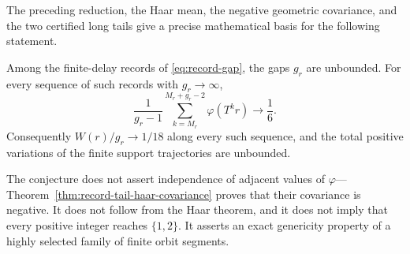 The preceding reduction, the Haar mean, the negative geometric covariance,
and the two certified long tails give a precise mathematical basis for the
following statement.

\begin{conjecture}
\label{conj:record-tail-genericity}
Among the finite-delay records of \eqref{eq:record-gap}, the gaps $g_r$ are
unbounded.  For every sequence of such records with $g_r\to\infty$,
\begin{equation}
 \frac1{g_r-1}\sum_{k=M_r}^{M_r+g_r-2}
       \varphi(T^kr)\longrightarrow\frac16.
 \label{eq:record-tail-genericity}
\end{equation}
Consequently $W(r)/g_r\to1/18$ along every such sequence, and the total
positive variations of the finite support trajectories are unbounded.
\end{conjecture}

\begin{nonclaim}
The conjecture does not assert independence of adjacent values of
$\varphi$---Theorem~\ref{thm:record-tail-haar-covariance} proves that their
covariance is negative.  It does not follow from the Haar theorem, and it does
not imply that every positive integer reaches $\{1,2\}$.  It asserts an exact
genericity property of a highly selected family of finite orbit segments.
\end{nonclaim}
